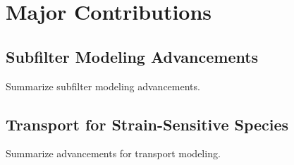 \section{Major Contributions}
\label{sec:conclusion:contributions}


\subsection{Subfilter Modeling Advancements}
\label{sec:conclusion:contributions:subfilter}

Summarize subfilter modeling advancements.


\subsection{Transport for Strain-Sensitive Species}
\label{sec:conclusion:contributions:transport}

Summarize advancements for transport modeling.

